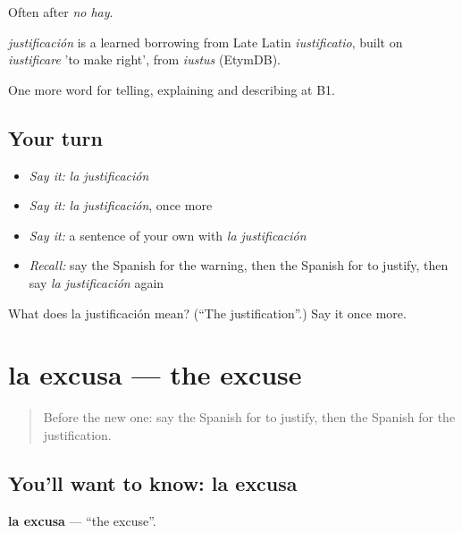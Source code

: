 Often after \emph{no hay}.

\begin{cousinweb}
\emph{justificación} is a learned borrowing from Late Latin \emph{iustificatio}, built on \emph{iustificare} 'to make right', from \emph{iustus} (EtymDB).
\end{cousinweb}

\begin{grammarlens}[title={What you've built}]
One more word for telling, explaining and describing at B1.
\end{grammarlens}

\subsection*{Your turn}
\begin{itemize}
\raggedright
  \item \emph{Say it:} \emph{la justificación}
  \item \emph{Say it:} \emph{la justificación}, once more
  \item \emph{Say it:} a sentence of your own with \emph{la justificación}
  \item \emph{Recall:} say the Spanish for the warning, then the Spanish for to justify, then say \emph{la justificación} again
\end{itemize}

\begin{tcolorbox}[breakable,colback=teal!4,colframe=teal!35!black,title={Before you move on}]
What does la justificación mean? (\textquotedblleft{}The justification\textquotedblright{}.) Say it once more.
\end{tcolorbox}
\section[la excusa]{la excusa — the excuse}

\label{lesson:ES-C586-excusa}



\begin{quote}
Before the new one: say the Spanish for to justify, then the Spanish for the justification.
\end{quote}

\subsection*{You'll want to know: la excusa}
\textbf{la excusa} — \textquotedblleft{}the excuse\textquotedblright{}.

